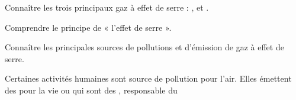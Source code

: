 \teteTermStssEnvi

\vspace*{-8pt}


\begin{objectifs}
  \item Connaître les trois principaux gaz à effet de serre : ,  et .
  \item Comprendre le principe de « l'effet de serre ».
  \item Connaître les principales sources de pollutions et d'émission de gaz à effet de serre.
\end{objectifs}

\begin{contexte}
  Certaines activités humaines sont source de pollution pour l'air.
  Elles émettent des  pour la vie ou qui sont des , responsable du 
  
\end{contexte}


